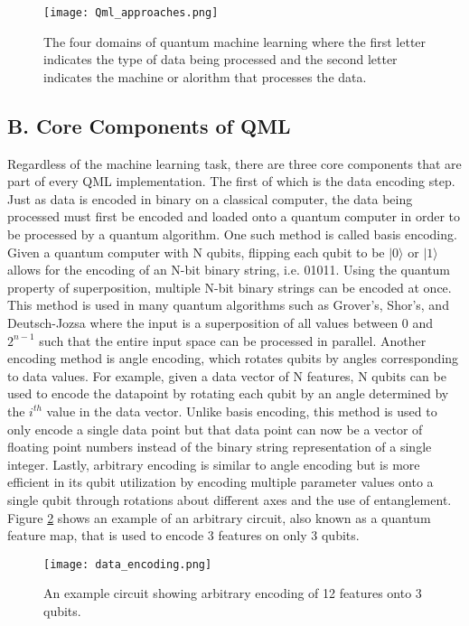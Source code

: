 \documentclass[
	a4paper, %
	10pt, %
	unnumberedsections, %
	twoside, %
]{LTJournalArticle}
\newcommand{\ket}[1]{\lvert#1\rangle} %
\begin{document}
\begin{figure} %
	\texttt{[image: Qml\_approaches.png]}
	\caption{The four domains of quantum machine learning where the first letter indicates the type of data being processed and the second letter indicates the machine or alorithm that processes the data.}
	\label{fig:qmldomains}
\end{figure}

\subsection{B. Core Components of QML}
Regardless of the machine learning task, there are three core components that are part of every QML implementation. The first of which is the data encoding step. Just as data is encoded in 
binary on a classical computer, the data being processed must first be encoded and loaded onto a quantum computer in order to be processed by a quantum algorithm. One such method is called 
basis encoding. Given a quantum computer with N qubits, flipping each qubit to be $\ket{0}$ or $\ket{1}$ allows for the encoding of an N-bit binary string, i.e. 01011. Using the quantum 
property of superposition, multiple N-bit binary strings can be encoded at once. This method is used in many quantum algorithms such as Grover's, Shor's, and Deutsch-Jozsa where the input is 
a superposition of all values between 0 and $2^{n-1}$ such that the entire input space can be processed in parallel. Another encoding method is angle encoding, which rotates qubits by angles 
corresponding to data values. For example, given a data vector of N features, N qubits can be used to encode the datapoint by rotating each qubit by an angle determined by the $i^{th}$ value 
in the data vector. Unlike basis encoding, this method is used to only encode a single data point but that data point can now be a vector of floating point numbers instead of the binary string 
representation of a single integer. Lastly, arbitrary encoding is similar to angle encoding but is more efficient in its qubit utilization by encoding multiple parameter values onto a single 
qubit through rotations about different axes and the use of entanglement. Figure \ref{fig:dataencoding} shows an example of an arbitrary circuit, also known as a quantum feature map, that is 
used to encode 3 features on only 3 qubits.

\begin{figure} %
	\texttt{[image: data\_encoding.png]}
	\caption{An example circuit showing arbitrary encoding of 12 features onto 3 qubits.}
	\label{fig:dataencoding}
\end{figure}
\end{document}
